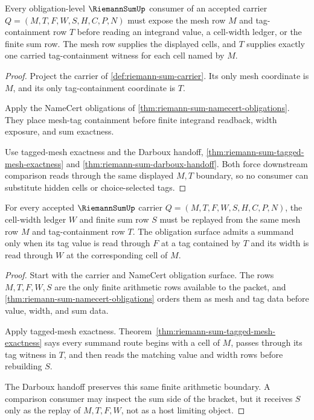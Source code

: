 \begin{theorem}
\label{thm:riemann-sum-mesh-tag-obligation}
Every obligation-level $\RiemannSumUp$ consumer of an accepted carrier $Q=(M,T,F,W,S,H,C,P,N)$ must expose the mesh row $M$ and tag-containment row $T$ before reading an integrand value, a cell-width ledger, or the finite sum row. The mesh row supplies the displayed cells, and $T$ supplies exactly one carried tag-containment witness for each cell named by $M$.
\end{theorem}
\begin{proof}
Project the carrier of \autoref{def:riemann-sum-carrier}. Its only mesh coordinate is $M$, and its only tag-containment coordinate is $T$.

Apply the NameCert obligations of \autoref{thm:riemann-sum-namecert-obligations}. They place mesh-tag containment before finite integrand readback, width exposure, and sum exactness.

Use tagged-mesh exactness and the Darboux handoff, \autoref{thm:riemann-sum-tagged-mesh-exactness} and \autoref{thm:riemann-sum-darboux-handoff}. Both force downstream comparison reads through the same displayed $M,T$ boundary, so no consumer can substitute hidden cells or choice-selected tags.
\end{proof}

\begin{theorem}
\label{thm:riemann-sum-width-exactness-obligation}
For every accepted $\RiemannSumUp$ carrier $Q=(M,T,F,W,S,H,C,P,N)$, the cell-width ledger $W$ and finite sum row $S$ must be replayed from the same mesh row $M$ and tag-containment row $T$. The obligation surface admits a summand only when its tag value is read through $F$ at a tag contained by $T$ and its width is read through $W$ at the corresponding cell of $M$.
\end{theorem}
\begin{proof}
Start with the carrier and NameCert obligation surface. The rows $M,T,F,W,S$ are the only finite arithmetic rows available to the packet, and \autoref{thm:riemann-sum-namecert-obligations} orders them as mesh and tag data before value, width, and sum data.

Apply tagged-mesh exactness. Theorem~\ref{thm:riemann-sum-tagged-mesh-exactness} says every summand route begins with a cell of $M$, passes through its tag witness in $T$, and then reads the matching value and width rows before rebuilding $S$.

The Darboux handoff preserves this same finite arithmetic boundary. A comparison consumer may inspect the sum side of the bracket, but it receives $S$ only as the replay of $M,T,F,W$, not as a host limiting object.
\end{proof}

